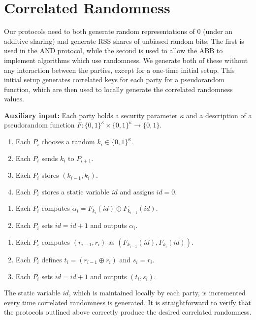 \section{Correlated Randomness}

Our protocols need to both generate random representations of 0 (under an additive sharing)
and generate RSS shares of unbiased random bits.
The first is used in the AND protocol,
while the second is used to allow the ABB to implement algorithms which use randomness.
We generate both of these without any interaction between the parties, 
except for a one-time initial setup.
This initial setup generates correlated keys for each party for a pseudorandom function, which are then used to locally generate the correlated randomness values.

\begin{protocol}[\Setup]
	{\bf Auxiliary input:} Each party holds a security parameter $\kappa$ and a description of a pseudorandom function $F: \{0, 1\}^\kappa \times \{0, 1\}^\kappa \rightarrow \{0, 1\}$.
	\begin{enumerate}
		\item Each $P_i$ chooses a random $k_i \in \{0, 1\}^\kappa$.
		\item Each $P_i$ sends $k_i$ to $P_{i + 1}$.
		\item Each $P_i$ stores $(k_{i - 1}, k_i)$.
		\item Each $P_i$ stores a static variable $id$ and assigns $id = 0$.
	\end{enumerate}
\end{protocol}

\begin{protocol}[\RandZero]
	\begin{enumerate}
		\item Each $P_i$ computes $\alpha_i = F_{k_i}(id) \oplus F_{k_{i - 1}}(id)$.
		\item Each $P_i$ sets $id = id + 1$ and outputs $\alpha_i$.
	\end{enumerate}
\end{protocol}

\begin{protocol}[\RandBit]
	\begin{enumerate}
		\item Each $P_i$ computes $(r_{i - 1}, r_i)$ as $(F_{k_{i-1}}(id), F_{k_{i}}(id))$.
		\item Each $P_i$ defines $t_i = (r_{i - 1} \oplus r_i)$ and $s_i = r_i$.
		\item Each $P_i$ sets $id = id + 1$ and outputs $(t_i, s_i)$.
	\end{enumerate}
\end{protocol}

The static variable $id$, which is maintained locally by each party, is incremented every time correlated randomness is generated.
It is straightforward to verify that the protocols outlined above correctly produce the desired correlated randomness.
